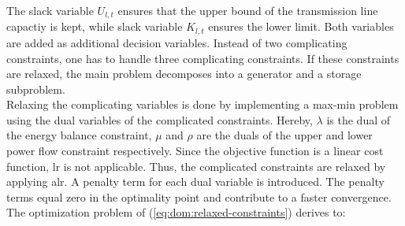 The slack variable $U_{l,t}$ ensures that the upper bound of the transmission line capactiy is kept, while slack variable $K_{l,t}$ ensures the lower limit. Both variables are added as additional decision variables. Instead of two complicating constraints, one has to handle three complicating constraints. If these constraints are relaxed, the main problem decomposes into a generator and a storage subproblem.\\

Relaxing the complicating variables is done by implementing a max-min problem using the dual variables of the complicated constraints. Hereby, $\lambda$ is the dual of the energy balance constraint, $\mu$ and $\rho$ are the duals of the upper and lower power flow constraint respectively. Since the objective function is a linear cost function, \gls{lr} is not applicable. Thus, the complicated constraints are relaxed by applying \gls{alr}. A penalty term for each dual variable is introduced. The penalty terms equal zero in the optimality point and contribute to a faster convergence. The optimization problem of (\ref{eq:dom:relaxed-constraints}) derives to:

